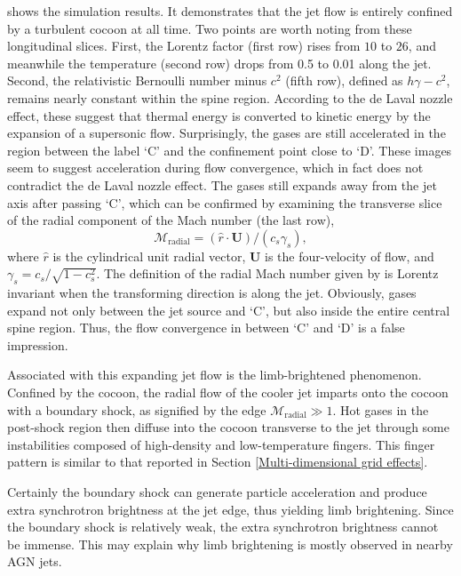  shows the simulation results. It demonstrates that the jet flow is entirely confined by a turbulent cocoon at all time. Two points are worth noting from these longitudinal slices. First, the Lorentz factor (first row) rises from $10$ to $26$, and meanwhile the temperature (second row) drops from 0.5 to 0.01 along the jet. Second, the relativistic Bernoulli number minus $c^2$ (fifth row), defined as $h\gamma-c^2$, remains nearly constant within the spine region. According to the de Laval nozzle effect, these suggest that thermal energy is converted to kinetic energy by the expansion of a supersonic flow. Surprisingly, the gases are still accelerated in the region between the label `C' and the confinement point close to `D'. These images seem to suggest acceleration during flow convergence, which in fact does not contradict the de Laval nozzle effect. The gases still expands away from the jet axis after passing `C', which can be confirmed by examining the transverse slice of the radial component of the Mach number (the last row),
\begin{equation}
     \mathscr{M}_{\text{radial}}=\left(\hat{r}\cdot \mathbf{U}\right)/\left(c_{s}\gamma_{s}\right),
     \label{eq:transverse Mach number}
 \end{equation}
where $\hat{r}$ is the cylindrical unit radial vector, $\mathbf{U}$ is the four-velocity of flow, and $\gamma_{s}=c_{s}/\sqrt{1-c_{s}^2}$. The definition of the radial Mach number given by  is Lorentz invariant when the transforming direction is along the jet. Obviously, gases expand not only between the jet source and `C', but also inside the entire central spine region. Thus, the flow convergence in between `C' and `D' is a false impression.

Associated with this expanding jet flow is the limb-brightened phenomenon. Confined by the cocoon, the radial flow of the cooler jet imparts onto the cocoon with a boundary shock, as signified by the edge $\mathscr{M}_{\text{radial}} \gg 1$. Hot gases in the post-shock region then diffuse into the cocoon transverse to the jet through some instabilities composed of high-density and low-temperature fingers. This finger pattern is similar to that reported in Section \ref{Multi-dimensional grid effects}.

Certainly the boundary shock can generate particle acceleration and produce extra synchrotron brightness at the jet edge, thus yielding limb brightening. Since the boundary shock is relatively weak, the extra synchrotron brightness cannot be immense. This may explain why limb brightening is mostly observed in nearby AGN jets.


